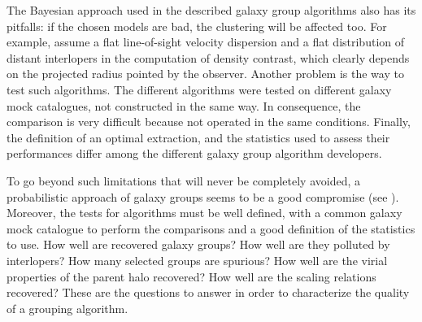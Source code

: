 
The Bayesian approach used in the described galaxy group algorithms also has
its pitfalls: if the chosen models are bad, the clustering will be affected
too. For example, \citet{Yang+07} assume a flat line-of-sight velocity
dispersion and a flat distribution of distant interlopers in the computation of
density contrast, which clearly depends on the projected radius pointed by the
observer. Another problem is the way to test such algorithms. The different
algorithms were tested on different galaxy mock catalogues, not constructed in
the same way. In consequence, the comparison is very difficult because not
operated in the same conditions. Finally, the definition of an optimal
extraction, and the statistics used to assess their performances differ among
the different galaxy group algorithm developers.

To go beyond such limitations that will never be completely avoided, a
probabilistic approach of galaxy groups seems to be a good compromise (see
). Moreover, the tests for algorithms must be well
defined, with a common galaxy mock catalogue to perform the comparisons and a
good definition of the statistics to use. How well are recovered galaxy groups?
How well are they polluted by interlopers? How many selected groups are
spurious? How well are the virial properties of the parent halo recovered? How
well are the scaling relations recovered? These are the questions to answer in
order to characterize the quality of a grouping algorithm.

